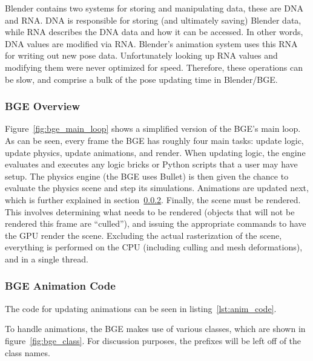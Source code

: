 Blender contains two systems for storing and manipulating data, these are DNA and RNA. DNA is responsible for storing (and ultimately saving) Blender data, while RNA describes the DNA data and how it can be accessed.
In other words, DNA values are modified via RNA.
Blender's animation system uses this RNA for writing out new pose data.
Unfortunately looking up RNA values and modifying them were never optimized for speed.
Therefore, these operations can be slow, and comprise a bulk of the pose updating time in Blender/BGE.


\subsubsection{BGE Overview}
\label{sec:bge_general_overview}


Figure~\ref{fig:bge_main_loop} shows a simplified version of the BGE's main loop.
As can be seen, every frame the BGE has roughly four main tasks: update logic, update physics, update animations, and render.
When updating logic, the engine evaluates and executes any logic bricks or Python scripts that a user may have setup.
The physics engine (the BGE uses Bullet) is then given the chance to evaluate the physics scene and step its simulations.
Animations are updated next, which is further explained in section~\ref{sec:bge_anim_overview}.
Finally, the scene must be rendered.
This involves determining what needs to be rendered (objects that will not be rendered this frame are ``culled''), and issuing the appropriate commands to have the GPU render the scene.
Excluding the actual rasterization of the scene, everything is performed on the CPU (including culling and mesh deformations), and in a single thread.

\subsubsection{BGE Animation Code}
\label{sec:bge_anim_overview}

The code for updating animations can be seen in listing~\ref{lst:anim_code}.


To handle animations, the BGE makes use of various classes, which are shown in figure~\ref{fig:bge_class}.
For discussion purposes, the prefixes will be left off of the class names.

